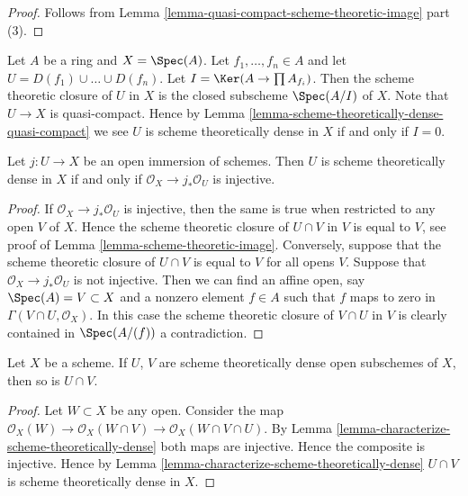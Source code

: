 \begin{proof}
Follows from Lemma \ref{lemma-quasi-compact-scheme-theoretic-image} part (3).
\end{proof}

\begin{example}
\label{example-scheme-theoretic-closure}
Let $A$ be a ring and $X = \Spec(A)$.
Let $f_1, \ldots, f_n \in A$ and let $U = D(f_1) \cup \ldots \cup D(f_n)$.
Let $I = \Ker(A \to \prod A_{f_i})$.
Then the scheme theoretic closure of $U$ in $X$
is the closed subscheme $\Spec(A/I)$ of $X$.
Note that $U \to X$ is quasi-compact. Hence by
Lemma \ref{lemma-scheme-theoretically-dense-quasi-compact}
we see $U$ is scheme theoretically dense in $X$ if and only if $I = 0$.
\end{example}

\begin{lemma}
\label{lemma-characterize-scheme-theoretically-dense}
Let $j : U \to X$ be an open immersion of schemes.
Then $U$ is scheme theoretically dense in $X$ if and only if
$\mathcal{O}_X \to j_*\mathcal{O}_U$ is injective.
\end{lemma}

\begin{proof}
If $\mathcal{O}_X \to j_*\mathcal{O}_U$ is injective,
then the same is true when restricted to any open $V$ of $X$.
Hence the scheme theoretic closure of $U \cap V$ in $V$
is equal to $V$, see proof of Lemma \ref{lemma-scheme-theoretic-image}.
Conversely, suppose that the scheme theoretic
closure of $U \cap V$ is equal to $V$ for all opens $V$.
Suppose that $\mathcal{O}_X \to j_*\mathcal{O}_U$ is not injective.
Then we can find an affine open, say $\Spec(A) = V \subset X$
and a nonzero element $f \in A$ such that $f$ maps to zero in
$\Gamma(V \cap U, \mathcal{O}_X)$. In this case the scheme theoretic
closure of $V \cap U$ in $V$ is clearly contained in $\Spec(A/(f))$
a contradiction.
\end{proof}

\begin{lemma}
\label{lemma-intersection-scheme-theoretically-dense}
Let $X$ be a scheme. If $U$, $V$ are scheme theoretically dense
open subschemes of $X$, then so is $U \cap V$.
\end{lemma}

\begin{proof}
Let $W \subset X$ be any open.
Consider the map
$\mathcal{O}_X(W) \to \mathcal{O}_X(W \cap V)
\to \mathcal{O}_X(W \cap V \cap U)$.
By Lemma \ref{lemma-characterize-scheme-theoretically-dense}
both maps are injective. Hence the composite is injective.
Hence by Lemma \ref{lemma-characterize-scheme-theoretically-dense}
$U \cap V$ is scheme theoretically dense in $X$.
\end{proof}

